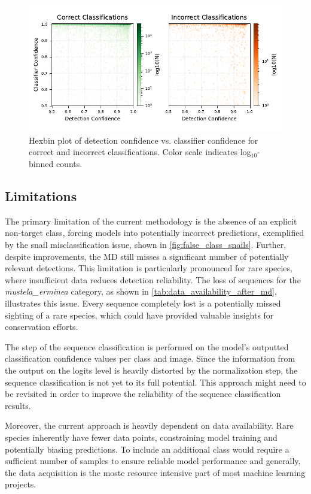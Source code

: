 \begin{figure}[ht]
\centering
\includegraphics{figures/pred_conf_hexbin.pdf}
\caption{Hexbin plot of detection confidence vs. classifier confidence for correct and incorrect classifications. Color scale indicates log$_{10}$-binned counts.}
\label{fig:pred_conf_hexbin}
\end{figure}

\subsection{Limitations}
The primary limitation of the current methodology is the absence of an explicit non-target class, forcing models into potentially incorrect predictions, exemplified by the snail misclassification issue, shown in \autoref{fig:false_class_snails}.
Further, despite improvements, the \ac{MD} still misses a significant number of potentially relevant detections.
This limitation is particularly pronounced for rare species, where insufficient data reduces detection reliability.
The loss of sequences for the \textit{mustela\_erminea} category, as shown in \autoref{tab:data_availability_after_md}, illustrates this issue.
Every sequence completely lost is a potentially missed sighting of a rare species, which could have provided valuable insights for conservation efforts.

The step of the sequence classification is performed on the model's outputted classification confidence values per class and image.
Since the information from the output on the logits level is heavily distorted by the normalization step, the sequence classification is not yet to its full potential.
This approach might need to be revisited in order to improve the reliability of the sequence classification results.

Moreover, the current approach is heavily dependent on data availability.
Rare species inherently have fewer data points, constraining model training and potentially biasing predictions.
To include an additional class would require a sufficient number of samples to ensure reliable model performance and generally, the data acquisition is the moste resource intensive part of most machine learning projects.
